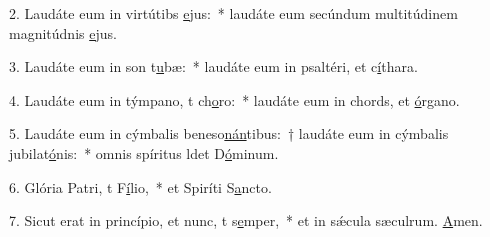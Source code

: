 2. Laudáte eum in virtútibs \uline{e}jus:~* laudáte eum secúndum multitúdinem magnitúdnis \uline{e}jus.\par 
3. Laudáte eum in son t\uline{u}bæ:~* laudáte eum in psaltéri, et c\uline{í}thara.\par 
4. Laudáte eum in týmpano, t ch\uline{o}ro:~* laudáte eum in chords, et \uline{ó}rgano.\par 
5. Laudáte eum in cýmbalis beneso\uline{nán}tibus:~† laudáte eum in cýmbalis jubilat\uline{ó}nis:~* omnis spíritus ldet D\uline{ó}minum.\par 
6. Glória Patri, t F\uline{í}lio,~* et Spiríti S\uline{a}ncto.\par 
7. Sicut erat in princípio, et nunc, t s\uline{e}mper,~* et in sǽcula sæculrum. \uline{A}men.\par 
